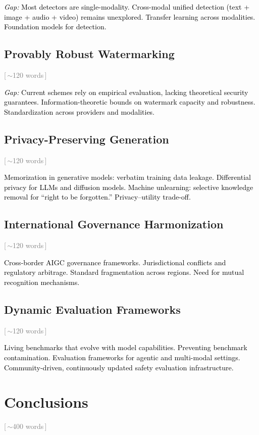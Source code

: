 \documentclass[preprint,12pt]{elsarticle}
\newcommand{\wordcount}[1]{\hfill\textcolor{gray}{\small[\,#1\,]}}
\newcommand{\outline}[1]{\textcolor{black}{#1}}
\begin{document}
\outline{%
\emph{Gap:} Most detectors are single-modality. Cross-modal unified detection (text + image + audio + video) remains unexplored. Transfer learning across modalities. Foundation models for detection.
}

\subsection{Provably Robust Watermarking} \wordcount{$\sim$120 words}

\outline{%
\emph{Gap:} Current schemes rely on empirical evaluation, lacking theoretical security guarantees. Information-theoretic bounds on watermark capacity and robustness. Standardization across providers and modalities.
}

\subsection{Privacy-Preserving Generation} \wordcount{$\sim$120 words}

\outline{%
Memorization in generative models: verbatim training data leakage. Differential privacy for LLMs and diffusion models. Machine unlearning: selective knowledge removal for ``right to be forgotten.'' Privacy--utility trade-off.
}

\subsection{International Governance Harmonization} \wordcount{$\sim$120 words}

\outline{%
Cross-border AIGC governance frameworks. Jurisdictional conflicts and regulatory arbitrage. Standard fragmentation across regions. Need for mutual recognition mechanisms.
}

\subsection{Dynamic Evaluation Frameworks} \wordcount{$\sim$120 words}

\outline{%
Living benchmarks that evolve with model capabilities. Preventing benchmark contamination. Evaluation frameworks for agentic and multi-modal settings. Community-driven, continuously updated safety evaluation infrastructure.
}


\section{Conclusions} \wordcount{$\sim$400 words}
\label{sec:conclusions}
\end{document}
